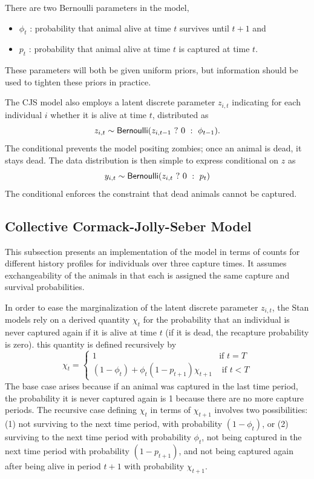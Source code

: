 There are two Bernoulli parameters in the model,
%
\begin{itemize}
\item $\phi_t$ : probability that animal alive at time $t$ survives
  until $t + 1$ and
\item $p_t$ : probability that animal alive at time $t$ is captured at
  time $t$.
\end{itemize}
%
These parameters will both be given uniform priors, but information
should be used to tighten these priors in practice.

The CJS model also employs a latent discrete parameter $z_{i,t}$
indicating for each individual $i$ whether it is alive at time $t$,
distributed as
%
\[
z_{i,t} \sim \distro{Bernoulli}(\ternary{z_{i,t-1}}{0}{\phi_{t-1}}).
\]
%
The conditional prevents the model positing zombies; once an animal is
dead, it stays dead.  The data distribution is then simple to express
conditional on $z$ as
%
\[
y_{i,t} \sim \distro{Bernoulli}(\ternary{z_{i,t}}{0}{p_t})
\]
%
The conditional enforces the constraint that dead animals cannot be captured.


\subsection{Collective Cormack-Jolly-Seber Model}

This subsection presents an implementation of the model in terms of
counts for different history profiles for individuals over three
capture times. It assumes exchangeability of the animals in that each
is assigned the same capture and survival probabilities.

In order to ease the marginalization of the latent discrete parameter
$z_{i,t}$, the Stan models rely on a derived quantity $\chi_t$ for
the probability that an individual is never captured again if it is
alive at time $t$ (if it is dead, the recapture probability is zero).
this quantity is defined recursively by
\[
\chi_t 
= 
\begin{cases}
1 
& \mbox{if } t = T
\\[3pt]
(1 - \phi_t) + \phi_t (1 - p_{t+1}) \chi_{t+1}
& \mbox{ if } t < T
\end{cases}
\]
%
The base case arises because if an animal was captured in the last
time period, the probability it is never captured again is 1 because
there are no more capture periods.  The recursive case defining
$\chi_{t}$ in terms of $\chi_{t+1}$ involves two possibilities: (1)
not surviving to the next time period, with probability $(1 -
\phi_t)$, or (2) surviving to the next time period with probability
$\phi_t$, not being captured in the next time period with probability
$(1 - p_{t+1})$, and not being captured again after being alive in
period $t+1$ with probability $\chi_{t+1}$. 

